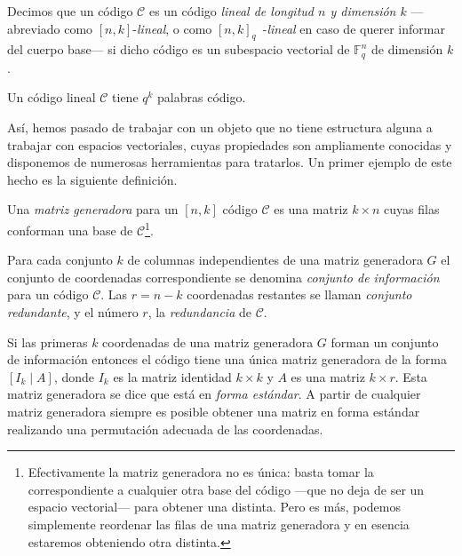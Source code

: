 
\begin{definition}
  Decimos que un código \(\mathcal C\) es un código \textit{lineal de longitud \(n\) y dimensión \(k\)} —abreviado como \([n, k]\)-\textit{lineal}, o como \([n, k]_q\)~-\textit{lineal} en caso de querer informar del cuerpo base— si dicho código es un subespacio vectorial de \(\mathbb F_q^n\) de dimensión \(k\).
\end{definition}


\begin{remark}
  Un código lineal \(\mathcal C\) tiene \(q^k\) palabras código.
\end{remark}

Así, hemos pasado de trabajar con un objeto que no tiene estructura alguna a trabajar con espacios vectoriales, cuyas propiedades son ampliamente conocidas y disponemos de numerosas herramientas para tratarlos.
Un primer ejemplo de este hecho es la siguiente definición.

\begin{definition}
  Una \textit{matriz generadora} para un \([n, k]\) código \(\mathcal C\) es una matriz \(k \times n\) cuyas filas conforman una base de \(\mathcal C\)\footnote{Efectivamente la matriz generadora no es única: basta tomar la correspondiente a cualquier otra base del código —que no deja de ser un espacio vectorial— para obtener una distinta. Pero es más, podemos simplemente reordenar las filas de una matriz generadora y en esencia estaremos obteniendo otra distinta.}.
\end{definition}

\begin{definition}
  Para cada conjunto \(k\) de columnas independientes de una matriz generadora \(G\) el conjunto de coordenadas correspondiente se denomina \textit{conjunto de información} para un código \(\mathcal C\). 
  Las \(r = n - k\) coordenadas restantes se llaman \textit{conjunto redundante}, y el número \(r\), la \textit{redundancia} de \(\mathcal C\).
\end{definition}

Si las primeras \(k\) coordenadas de una matriz generadora \(G\) forman un conjunto de información entonces el código tiene una única matriz generadora de la forma \([I_k \mid A]\), donde \(I_k\) es la matriz identidad \(k \times k\) y \(A\) es una matriz \(k \times r\). 
Esta matriz generadora se dice que está en \textit{forma estándar}.
A partir de cualquier matriz generadora siempre es posible obtener una matriz en forma estándar realizando una permutación adecuada de las coordenadas.

